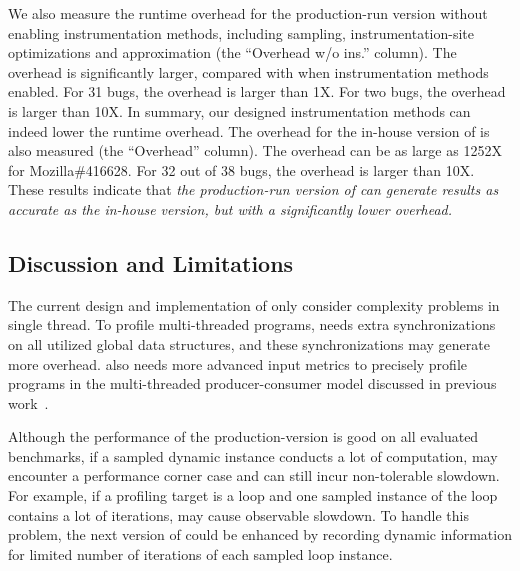 We also measure the runtime overhead for the production-run 
version without enabling instrumentation methods, 
including sampling, instrumentation-site optimizations
and approximation (the ``Overhead w/o ins.'' column). 
The overhead is significantly larger, compared with when instrumentation methods enabled. 
For 31 bugs, the overhead is larger than 1X. 
For two bugs, the overhead is larger than 10X.
In summary, our designed instrumentation methods can 
indeed lower the runtime overhead. 
The overhead for the in-house version 
of \Tool is also measured 
(the ``Overhead'' column). 
The overhead can be as large as 1252X for 
Mozilla\#416628.
For 32 out of 38 bugs, the overhead is larger than 10X. 
These results indicate that \emph{the 
production-run version of \Tool can generate results as accurate as the in-house version,
but with a significantly lower overhead. }


\subsection{Discussion and Limitations}

The current design and implementation of \Tool 
only consider complexity problems in single thread. 
To profile multi-threaded programs, 
\Tool needs extra synchronizations on all utilized global data structures, 
and these synchronizations may generate more overhead. 
\Tool also needs more advanced input metrics to precisely profile programs 
in the multi-threaded producer-consumer 
model discussed in previous work~\cite{Aprof2}. 

Although the performance of the production-version 
is good on all evaluated benchmarks, 
if a sampled dynamic instance conducts a lot of computation, 
\Tool may encounter a performance corner case and can still incur non-tolerable slowdown.
For example, if a profiling target is a loop and 
one sampled instance of the loop contains a lot of iterations, 
\Tool may cause observable slowdown. 
To handle this problem, the next version of \Tool could 
be enhanced by recording dynamic information for limited number 
of iterations of  each sampled loop instance. 



